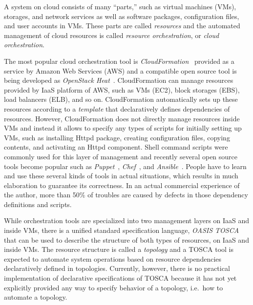 \documentclass[12pt]{report}
\begin{document}
A system on cloud consists of many ``parts,'' such as virtual machines
(VMs), storages, and network services as well as software packages,
configuration files, and user accounts in VMs. These parts are called
{\it resources} and the automated management of cloud resources is
called {\it resource orchestration}, or {\it cloud orchestration}.

The most popular cloud orchestration tool is {\it
  CloudFormation}~\cite{CloudFormation} provided as a service by
Amazon Web Services (AWS) and a compatible open source tool is being
developed as {\it OpenStack Heat}~\cite{Heat}. CloudFormation can
manage resources provided by IaaS platform of AWS, such as VMs (EC2),
block storages (EBS), load balancers (ELB), and so on. CloudFormation
automatically sets up these resources according to a {\it template}
that declaratively defines dependencies of resources. However,
CloudFormation does not directly manage resources inside VMs and
instead it allows to specify any types of scripts for initially
setting up VMs, such as installing Httpd package, creating
configuration files, copying contents, and activating an Httpd
component. Shell command scripts were commonly used for this layer of
management and recently several open source tools become popular such
as {\it Puppet}~\cite{Puppet}, {\it Chef}~\cite{Chef}, and {\it
  Ansible}~\cite{Ansible}. People have to learn and use these
several kinds of tools in actual situations, which results in much
elaboration to guarantee its correctness. In an actual commercial
experience of the author, more than 50\% of troubles are caused by
defects in those dependency definitions and scripts.

While orchestration tools are specialized into two management layers
on IaaS and inside VMs, there is a unified standard specification
language, {\it OASIS TOSCA}~\cite{TOSCA} that can be used to describe
the structure of both types of resources, on IaaS and inside VMs. The
resource structure is called a {\it topology} and a TOSCA tool is
expected to automate system operations based on resource dependencies
declaratively defined in topologies.  Currently, however, there is no
practical implementation of declarative specifications of TOSCA
because it has not yet explicitly provided any way to specify behavior
of a topology, i.e.\ how to automate a topology.
\end{document}
